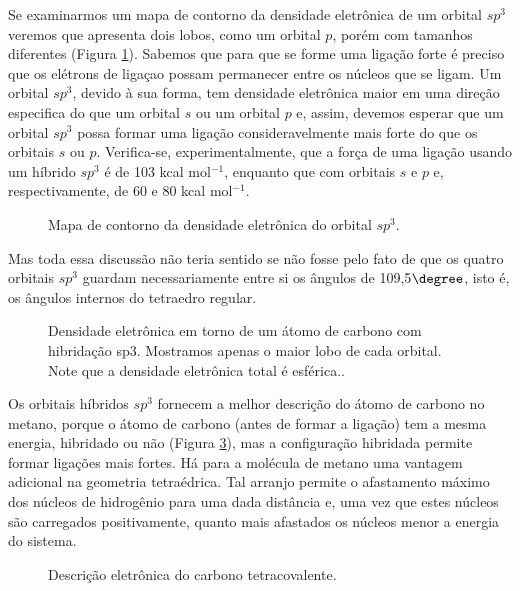 Se examinarmos um mapa de contorno da densidade eletrônica de um orbital $sp^3$ veremos que apresenta dois lobos, como um orbital $p$, porém com tamanhos diferentes (Figura \ref{fig2_10}). Sabemos que para que se forme uma ligação forte é preciso que os elétrons de ligaçao possam permanecer entre os núcleos que se ligam. Um orbital $sp^3$, devido à sua forma, tem densidade eletrônica maior em uma direção especifica do que um orbital $s$ ou um orbital $p$ e, assim, devemos esperar que um orbital $sp^3$ possa formar uma ligação consideravelmente mais forte do que os orbitais $s$ ou $p$. Verifica-se, experimentalmente, que a força de uma ligação  usando um híbrido $sp^3$ é de 103 kcal mol$^{-1}$, enquanto que com orbitais $s$ e $p$ e, respectivamente, de 60 e 80 kcal mol$^{-1}$. 

\begin{figure}[H]
    \centering
    \caption{Mapa de contorno da densidade eletrônica do orbital $sp^3$.}
    \label{fig2_10}
\end{figure}

Mas toda essa discussão não teria sentido se não fosse pelo fato de que os quatro orbitais $sp^3$ guardam necessariamente entre si os ângulos de 109,5$\degree$, isto é, os ângulos internos do tetraedro regular. 

\begin{figure}[H]
    \centering
    \caption{Densidade eletrônica em torno de um átomo de carbono com hibridação sp3. Mostramos apenas o maior lobo de cada orbital. Note que a densidade eletrônica total é esférica..}
    \label{fig2_11}
\end{figure}

Os orbitais híbridos $sp^3$ fornecem a melhor descrição do átomo de carbono no metano, porque o átomo de carbono (antes de formar a ligação) tem a mesma energia, hibridado ou não (Figura \ref{fig2_12}), mas a configuração hibridada permite formar ligações mais fortes. Há para a molécula de metano uma vantagem adicional na geometria tetraédrica. Tal arranjo permite o afastamento máximo dos núcleos de hidrogênio para uma dada distância  e, uma vez que estes núcleos são carregados positivamente, quanto mais afastados os núcleos menor a energia do sistema.

\begin{figure}[H]
    \centering
    \caption{Descrição eletrônica do carbono tetracovalente.}
    \label{fig2_12}
\end{figure}

